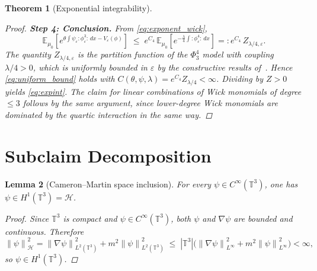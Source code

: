 \documentclass[11pt,a4paper]{article}
\newtheorem{theorem}{Theorem}[section]
\newtheorem{lemma}[theorem]{Lemma}
\theoremstyle{definition}
\newcommand{\T}{\mathbb{T}}
\newcommand{\E}{\mathbb{E}}
\newcommand{\Hc}{\mathcal{H}}
\newcommand{\norm}[1]{\left\|#1\right\|}
\newcommand{\wick}[1]{:\!#1\!:}
\begin{document}
\begin{theorem}[Exponential integrability]
\begin{proof}
\medskip
\noindent\textbf{Step 4: Conclusion.}
From \eqref{eq:exponent_wick},
\[
\E_{\mu_0}\!\left[e^{\theta\int\psi_\varepsilon\wick{\phi_\varepsilon^3}\,dx - V_\varepsilon(\phi)}\right]
\;\le\;
e^{C_4}\,\E_{\mu_0}\!\left[e^{-\frac{\lambda}{4}\int\wick{\phi_\varepsilon^4}\,dx}\right]
=: e^{C_4}\,Z_{\lambda/4,\varepsilon}.
\]
The quantity $Z_{\lambda/4,\varepsilon}$ is the partition function of the $\Phi^4_3$ model with coupling $\lambda/4>0$, which is uniformly bounded in $\varepsilon$ by the constructive results of~\cite{GlimmJaffe1987}.
Hence \eqref{eq:uniform_bound} holds with $C(\theta,\psi,\lambda) = e^{C_4}Z_{\lambda/4}<\infty$.
Dividing by $Z>0$ yields \eqref{eq:expint}.
The claim for linear combinations of Wick monomials of degree $\le 3$ follows by the same argument, since lower-degree Wick monomials are dominated by the quartic interaction in the same way.
\end{proof}
\end{theorem}

\section{Subclaim Decomposition}

\begin{lemma}[Cameron--Martin space inclusion]\label{lem:CMspace}
For every $\psi\in C^\infty(\T^3)$, one has $\psi\in H^1(\T^3) = \Hc$.

\begin{proof}
Since $\T^3$ is compact and $\psi\in C^\infty(\T^3)$, both $\psi$ and $\nabla\psi$ are bounded and continuous.  Therefore
\[
\norm{\psi}_\Hc^2 = \norm{\nabla\psi}_{L^2(\T^3)}^2 + m^2\norm{\psi}_{L^2(\T^3)}^2 \;\le\; |\T^3|\bigl(\norm{\nabla\psi}_{L^\infty}^2 + m^2\norm{\psi}_{L^\infty}^2\bigr) < \infty,
\]
so $\psi\in H^1(\T^3)$.
\end{proof}
\end{lemma}
\end{document}
